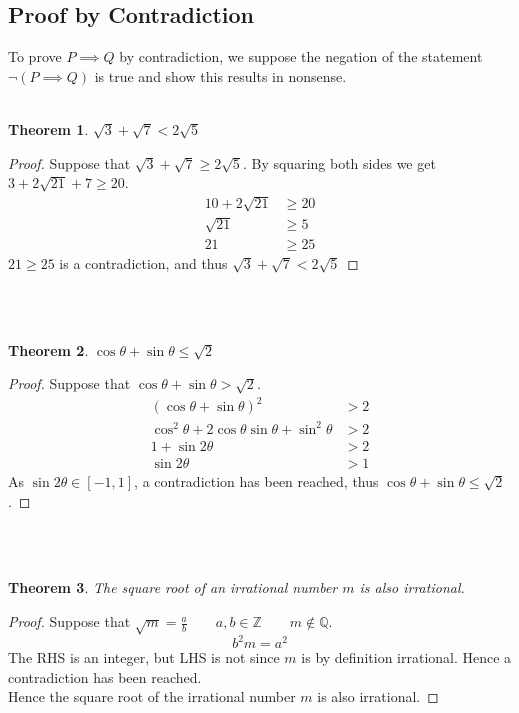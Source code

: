 \documentclass[a4paper,twoside,10pt]{article}
\newenvironment{examquestion}[1]{%
	\mbox{}\\\tcolorbox[beamer,breakable,%
	title=Exam-style Question: #1,standard jigsaw,opacityback=0, colframe=red!75!black, boxrule=2pt]}{\endtcolorbox\mbox{}\\}
\newtheorem*{theorem*}{Theorem}
\begin{document}
		\subsection{Proof by Contradiction}
			To prove $P\implies Q$ by contradiction, we suppose the negation of the statement $\neg(P\implies Q)$ is true and show this results in nonsense.\\
			\begin{examquestion}{1000 Spesh Questions Doc Proof 2}
				\begin{theorem*}
					$\sqrt{3}+\sqrt{7}<2\sqrt{5}$
				\end{theorem*}
				\begin{proof}
					Suppose that $\sqrt{3}+\sqrt{7}\geq2\sqrt{5}$. By squaring both sides we get $3+2\sqrt{21}+7\geq20$.
					\begin{align*}
						10+2\sqrt{21}&\geq20\\
						\sqrt{21}&\geq{5}\\
						21&\geq25
					\end{align*}
					$21\geq25$ is a contradiction, and thus $\sqrt{3}+\sqrt{7}<2\sqrt{5}$
				\end{proof}
			\end{examquestion}
			\begin{examquestion}{1000 Spesh Questions Doc Proof 43}
				\begin{theorem*}
					$\cos\theta+\sin\theta\leq\sqrt{2}$
				\end{theorem*}
				\begin{proof}
					Suppose that $\cos\theta+\sin\theta>\sqrt{2}$.\\
					\begin{align*}
						\left(\cos\theta+\sin\theta\right)^2&>2\\
						\cos^2\theta+2\cos\theta\sin\theta+\sin^2\theta&>2\\
						1+\sin2\theta&>2\\
						\sin2\theta&>1
					\end{align*}
					As $\sin2\theta\in[-1,1]$, a contradiction has been reached, thus $\cos\theta+\sin\theta\leq\sqrt{2}$.
				\end{proof}
			\end{examquestion}
			\begin{examquestion}{1000 Spesh Questions Doc Proof 51}
				\begin{theorem*}
					The square root of an irrational number $m$ is also irrational.
				\end{theorem*}
				\begin{proof}
					Suppose that $\sqrt{m}=\frac{a}{b}\qquad a,b\in\mathbb{Z}\qquad m\notin\mathbb{Q}$.
					\[
						b^2m=a^2
					\]
					The RHS is an integer, but LHS is not since $m$ is by definition irrational. Hence a contradiction has been reached.\\
					Hence the square root of the irrational number $m$ is also irrational.
				\end{proof}
			\end{examquestion}
\end{document}
